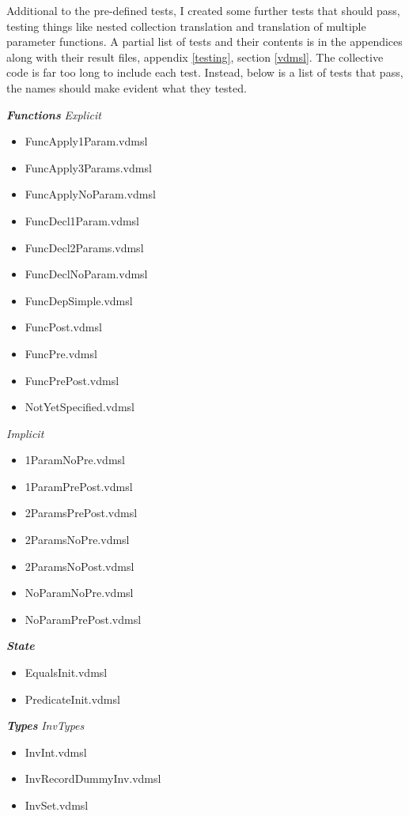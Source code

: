 Additional to the pre-defined tests, I created some further tests that should pass, testing things like nested collection translation and translation of multiple parameter functions. A partial list of tests and their contents is in the appendices along with their result files, appendix \ref{testing}, section \ref{vdmsl}. The collective code is far too long to include each test. Instead, below is a list of tests that pass, the names should make evident what they tested.
\begin{multicols}{2}
\textbf{\emph{Functions}}\hfill\break
\emph{Explicit}
\begin{itemize}
\item FuncApply1Param.vdmsl
\item FuncApply3Params.vdmsl
\item FuncApplyNoParam.vdmsl
\item FuncDecl1Param.vdmsl
\item FuncDecl2Params.vdmsl
\item FuncDeclNoParam.vdmsl
\item FuncDepSimple.vdmsl
\item FuncPost.vdmsl
\item FuncPre.vdmsl
\item FuncPrePost.vdmsl
\item NotYetSpecified.vdmsl
\end{itemize}
\emph{Implicit}
\begin{itemize}
\item 1ParamNoPre.vdmsl
\item 1ParamPrePost.vdmsl
\item 2ParamsPrePost.vdmsl
\item 2ParamsNoPre.vdmsl
\item 2ParamsNoPost.vdmsl
\item NoParamNoPre.vdmsl
\item NoParamPrePost.vdmsl
\end{itemize}
\textbf{\emph{State}}
\begin{itemize}
\item EqualsInit.vdmsl
\item PredicateInit.vdmsl
\end{itemize}
\textbf{\emph{Types}}\hfill\break
\emph{InvTypes}
\begin{itemize}
\item InvInt.vdmsl
\item InvRecordDummyInv.vdmsl
\item InvSet.vdmsl
\end{itemize}

\end{multicols}
